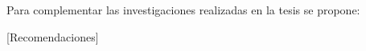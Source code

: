 \begin{recomendations}

Para complementar las investigaciones realizadas en la tesis se propone:

[Recomendaciones]


\end{recomendations}
